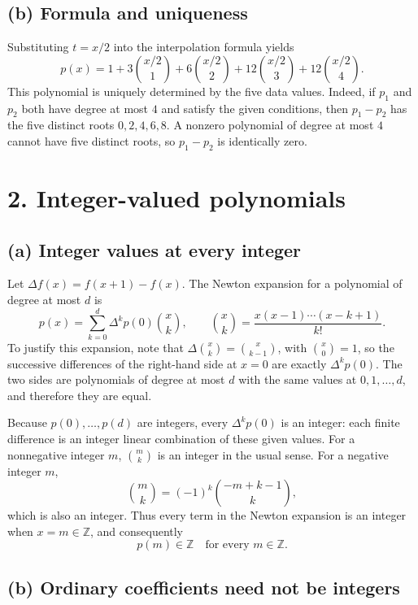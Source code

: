 \documentclass[11pt]{article}
\begin{document}
\subsection*{(b) Formula and uniqueness}

Substituting \(t=x/2\) into the interpolation formula yields
\[
\boxed{
p(x)=1+3\binom{x/2}{1}+6\binom{x/2}{2}
        +12\binom{x/2}{3}+12\binom{x/2}{4}.
}
\]
This polynomial is uniquely determined by the five data values. Indeed, if
\(p_1\) and \(p_2\) both have degree at most \(4\) and satisfy the given
conditions, then \(p_1-p_2\) has the five distinct roots
\(0,2,4,6,8\). A nonzero polynomial of degree at most \(4\) cannot have five
distinct roots, so \(p_1-p_2\) is identically zero.

\section*{2. Integer-valued polynomials}

\subsection*{(a) Integer values at every integer}

Let \(\Delta f(x)=f(x+1)-f(x)\). The Newton expansion for a polynomial of
degree at most \(d\) is
\[
    p(x)=\sum_{k=0}^{d}\Delta^k p(0)\binom{x}{k},
    \qquad
    \binom{x}{k}=\frac{x(x-1)\cdots(x-k+1)}{k!}.
\]
To justify this expansion, note that
\(\Delta\binom{x}{k}=\binom{x}{k-1}\), with
\(\binom{x}{0}=1\), so the successive differences of the right-hand side
at \(x=0\) are exactly \(\Delta^k p(0)\). The two sides are polynomials of
degree at most \(d\) with the same values at \(0,1,\ldots,d\), and therefore
they are equal.

Because \(p(0),\ldots,p(d)\) are integers, every
\(\Delta^k p(0)\) is an integer: each finite difference is an integer linear
combination of these given values. For a nonnegative integer \(m\),
\(\binom{m}{k}\) is an integer in the usual sense. For a negative integer
\(m\),
\[
    \binom{m}{k}
    =(-1)^k\binom{-m+k-1}{k},
\]
which is also an integer. Thus every term in the Newton expansion is an
integer when \(x=m\in\mathbb Z\), and consequently
\[
    \boxed{p(m)\in\mathbb Z\quad\text{for every }m\in\mathbb Z.}
\]

\subsection*{(b) Ordinary coefficients need not be integers}
\end{document}
